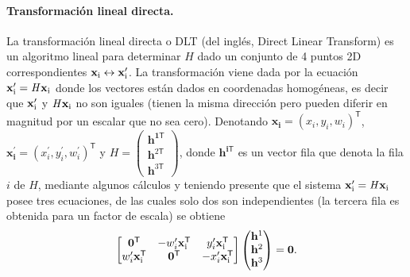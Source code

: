 \paragraph{Transformación lineal directa.} 
La transformación lineal directa o DLT (del inglés, Direct Linear Transform) es un algoritmo lineal para determinar $\textit{H}$ dado un conjunto de 4 puntos 2D correspondientes $\mathbf{x_{\textrm{i}}\leftrightarrow x_{\textrm{i}}^{\textrm{\ensuremath{\prime}}}}$. La transformación viene dada por la ecuación 
$\mathbf{x_{\textrm{i}}^{\textrm{\ensuremath{\prime}}}=\textrm{\textit{H}}x_{\textrm{i}}}$ donde los vectores están dados en coordenadas homogéneas, es decir que $\mathbf{x_{\textrm{i}}^{\textrm{\ensuremath{\prime}}}}$ y $\mathbf{\textrm{\textit{H}}x_{\textrm{i}}}$  no son iguales (tienen la misma dirección pero pueden diferir en magnitud por un escalar que no sea cero). Denotando $\mathbf{x_{\textrm{i}}=}(x_{i},y_{i},w_{i})^{\mathsf{T}}$, $\mathbf{x_{\textrm{i}}^{\prime}=}(x_{i}^{\prime},y_{i}^{\prime},w_{i}^{\prime})^{\mathsf{T}}$ y $\textit{H}=\left(\begin{array}{c}
\mathbf{\mathbf{h^{\textrm{1}\mathsf{T}}}}\\
\mathbf{h}^{\textrm{2}\textsf{T}}\\
\mathbf{h}^{\textrm{3}\textsf{T}}
\end{array}\right)$, donde $\mathbf{h^{\textrm{i}\textsf{T}}}$ es un vector fila que denota la fila $i$ de $\textit{H}$, mediante algunos cálculos \cite[p. 89]{Hartley2004} y teniendo presente que el sistema $\mathbf{x_{\textrm{i}}^{\textrm{\ensuremath{\prime}}}=\textrm{\textit{H}}x_{\textrm{i}}}$ posee tres ecuaciones, de las cuales solo dos son independientes (la tercera fila es obtenida para un factor de escala) %
se obtiene
\begin{equation}
\begin{bmatrix}\mathbf{0}^{\textsf{T}} & -w_{i}^{\prime}\mathbf{x_{\textrm{i}}^{\textrm{\textsf{T}}}} & y_{i}^{\prime}\mathbf{x_{\textrm{i}}^{\textrm{\textsf{T}}}}\\
w_{i}^{\prime}\mathbf{x_{\textrm{i}}^{\textrm{\textsf{T}}}} & \mathbf{0}^{\textsf{T}} & -x_{i}^{\prime}\mathbf{x_{\textrm{i}}^{\textrm{\textsf{T}}}}
\end{bmatrix}\begin{pmatrix}\mathbf{h^{\textrm{1}}}\\
\mathbf{h^{\textrm{2}}}\\
\mathbf{h^{\textrm{3}}}
\end{pmatrix}=\mathbf{0}.\label{eq:hxsystem}
\end{equation}

